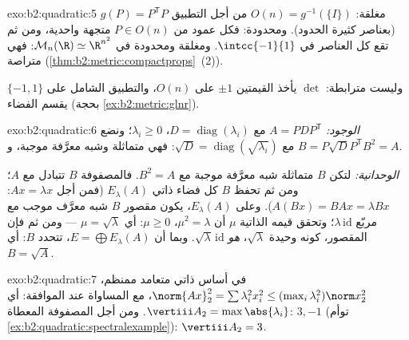 \begin{solution}{exo:b2:quadratic:5}
مغلقة: $O(n) = g^{-1}(\{I\})$ من أجل التطبيق  $g(P) =
P^{\mathsf T}P$ (بعناصر كثيرة الحدود). ومحدودة: فكل عمود من $P
\in O(n)$ متجهة واحدية، ومن ثم تقع كل العناصر في $\intcc{-1}{1}$.
ومغلقة ومحدودة في $\mathcal{M}_n(\R) \simeq \R^{n^2}$: فهي متراصة
(\cref{thm:b2:metric:compactprops}~(2)).

وليست مترابطة:  $\det$ يأخذ القيمتين $\pm1$ على $O(n)$، والتطبيق
 الشامل على $\{-1, 1\}$ يقسم الفضاء
(بحجة \cref{ex:b2:metric:glnr}).
\end{solution}

\begin{solution}{exo:b2:quadratic:6}
\emph{الوجود:} $A = PDP^{\mathsf T}$ مع $D =
\operatorname{diag}(\lambda_i)$، $\lambda_i \geq 0$؛ ونضع $B =
P\sqrt D P^{\mathsf T}$ مع $\sqrt D =
\operatorname{diag}(\sqrt{\lambda_i})$: فهي متماثلة وشبه معرَّفة
موجبة، و$B^2 = A$.

\emph{الوحدانية:} لتكن $B$ متماثلة شبه معرَّفة موجبة مع $B^2 = A$. فالمصفوفة $B$
تتبادل مع $A$؛ ومن ثم تحفظ $B$ كل فضاء ذاتي
$E_\lambda(A)$ (فمن أجل $Ax = \lambda x$: $A(Bx) = BAx = \lambda Bx$).
وعلى $E_\lambda(A)$، يكون مقصور $B$  شبه معرَّف موجب مع
مربّع $\lambda\,\mathrm{id}$؛ وتحقق قيمه الذاتية $\mu$ أن $\mu^2
= \lambda$، $\mu \geq 0$: أي $\mu = \sqrt\lambda$ --- ومن ثم فإن
المقصور، كونه   وحيدة
$\sqrt\lambda$، \emph{هو} $\sqrt\lambda\,\mathrm{id}$. وبما أن $E =
\bigoplus E_\lambda(A)$، تتحدد $B$: أي $B = \sqrt A$.
\end{solution}

\begin{solution}{exo:b2:quadratic:7}
في أساس ذاتي متعامد ممنظم، $\norm{Ax}_2^2 = \sum \lambda_i^2
x_i^2 \leq (\max_i \lambda_i^2)\norm x_2^2$، مع المساواة عند
 الموافقة: أي $\vertiii A_2 = \max\abs{\lambda_i}$.
ومن أجل المصفوفة المعطاة:  $3, -1$
(توأم \cref{ex:b2:quadratic:spectralexample}):
$\vertiii A_2 = 3$.
\end{solution}

